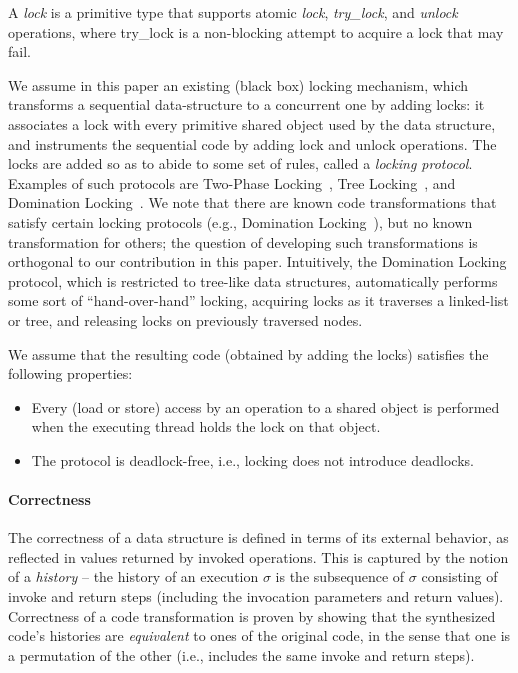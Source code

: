 A \emph{lock} is a primitive type that supports atomic \emph{lock}, \emph{try\_lock}, and \emph{unlock} operations, 
where try\_lock is a non-blocking attempt to acquire a lock that may fail. 

We assume in this paper an existing (black box) locking mechanism, which transforms a sequential data-structure to a concurrent one by adding locks:
it associates a lock with every primitive shared object used by the data structure, and instruments the sequential code 
by adding lock and unlock operations. 
The locks are added so as to abide to some set of rules, called a \emph{locking protocol}. 
Examples of such protocols are Two-Phase Locking~\cite{2pl}, Tree Locking~\cite{SilberschatzK1980}, and Domination Locking~\cite{Gueta2011}. 
We note that there are known code transformations that satisfy certain locking protocols (e.g., Domination Locking~\cite{Gueta2011}), but no known
transformation for others; the question of developing such transformations is orthogonal to our contribution in this paper. 
Intuitively, the Domination Locking protocol, which is restricted to tree-like data structures,
automatically performs some sort of ``hand-over-hand'' locking, acquiring locks as
it traverses a linked-list or tree, and releasing locks on previously traversed nodes. 

We assume that the resulting code (obtained by adding the locks) satisfies the following properties:
\begin{itemize}
\item Every (load or store) access by an operation to a shared object is performed when the executing thread holds the lock on that object.
\item The protocol is deadlock-free, i.e., locking does not introduce deadlocks.
\end{itemize}


\paragraph{Correctness}

The correctness of a data structure is defined in terms of its external behavior, as reflected in values returned by invoked operations. 
This is captured by the notion of a \emph{history} -- the history of an execution $\sigma$ is the subsequence of $\sigma$ consisting 
of invoke and return steps (including the invocation parameters and return values). Correctness of a code transformation is proven 
by showing that the synthesized code's histories are \emph{equivalent} to ones of the original code, in the sense that one is a permutation 
of the other (i.e., includes the same invoke and return steps). 

